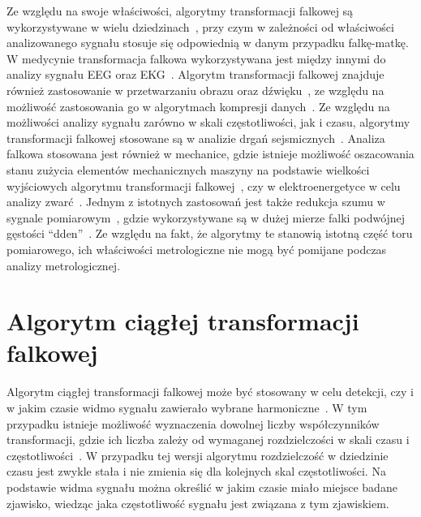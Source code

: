 Ze względu na swoje właściwości, algorytmy transformacji falkowej są wykorzystywane w wielu dziedzinach~\cite{akujuobi_applications}, przy czym w zależności od właściwości analizowanego sygnału stosuje się odpowiednią w danym przypadku falkę-matkę. W medycynie transformacja falkowa wykorzystywana jest między innymi do analizy sygnału EEG oraz EKG~\cite{ocak_medicine, unser_medicine}. Algorytm transformacji falkowej znajduje również zastosowanie w przetwarzaniu obrazu oraz dźwięku~\cite{kotteri_imagecomp}, ze względu na możliwość zastosowania go w algorytmach kompresji danych~\cite{reddy_compression}. Ze względu na możliwości analizy sygnału zarówno w skali częstotliwości, jak i czasu, algorytmy transformacji falkowej stosowane są w analizie drgań sejsmicznych~\cite{anping_seismic}. Analiza falkowa stosowana jest również w mechanice, gdzie istnieje możliwość oszacowania stanu zużycia elementów mechanicznych maszyny na podstawie wielkości wyjściowych algorytmu transformacji falkowej~\cite{yan_mechanics}, czy w elektroenergetyce w celu analizy zwarć~\cite{niedopytalski_zwar}. Jednym z istotnych zastosowań jest także redukcja szumu w sygnale pomiarowym~\cite{auth_denoise}, gdzie wykorzystywane są w dużej mierze falki podwójnej gęstości \enquote{dden}~\cite{vimala_ddendenoise}. Ze względu na fakt, że algorytmy te stanowią istotną część toru pomiarowego, ich właściwości metrologiczne nie mogą być pomijane podczas analizy metrologicznej.

\section{Algorytm ciągłej transformacji falkowej}

Algorytm ciągłej transformacji falkowej może być stosowany w celu detekcji, czy i w jakim czasie widmo sygnału zawierało wybrane harmoniczne~\cite{anping_seismic}. W tym przypadku istnieje możliwość wyznaczenia dowolnej liczby współczynników transformacji, gdzie ich liczba zależy od wymaganej rozdzielczości w skali czasu i częstotliwości~\cite{wallen_handbook}. W przypadku tej wersji algorytmu rozdzielczość w dziedzinie czasu jest zwykle stała i nie zmienia się dla kolejnych skal częstotliwości. Na podstawie widma sygnału można określić w jakim czasie miało miejsce badane zjawisko, wiedząc jaka częstotliwość sygnału jest związana z tym zjawiskiem.

